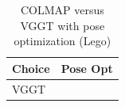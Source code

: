 \begin{table}[H]
\caption{COLMAP versus VGGT with pose optimization (Lego)}
\label{tab:04_pose_opt_lego}
\begin{tabular}{ll}
\toprule
Choice & Pose Opt \\
\midrule
VGGT &  \\
\bottomrule
\end{tabular}
\end{table}
